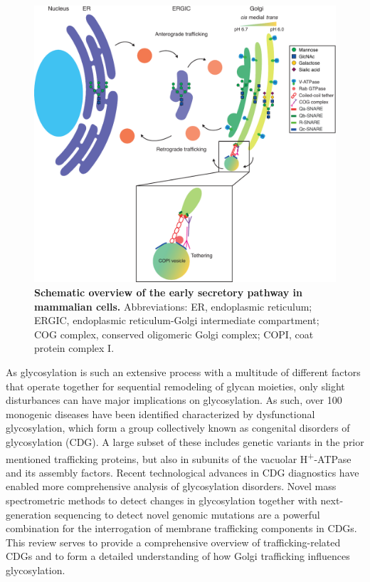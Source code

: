 \begin{figure}
    \includegraphics[keepaspectratio=true,width=\textwidth,height=\textheight]{chapters/chapter2/chapter2_Figure1.pdf}
    \caption{\textbf{Schematic overview of the early secretory pathway in mammalian cells.} Abbreviations: ER, endoplasmic reticulum; ERGIC, endoplasmic reticulum-Golgi intermediate compartment; COG complex, conserved oligomeric Golgi complex; COPI, coat protein complex I.}
    \label{fig:ch2fig1}
\end{figure}

As glycosylation is such an extensive process with a multitude of different factors that operate together for sequential remodeling of glycan moieties, only slight disturbances can have major implications on glycosylation. As such, over 100 monogenic diseases have been identified characterized by dysfunctional glycosylation, which form a group collectively known as congenital disorders of glycosylation (CDG)\cite{fisher_bridging_2016,freeze_genetic_2006,freeze_solving_2014}. A large subset of these includes genetic variants in the prior mentioned trafficking proteins, but also in subunits of the vacuolar H\textsuperscript{+}-ATPase and its assembly factors. Recent technological advances in CDG diagnostics have enabled more comprehensive analysis of glycosylation disorders. Novel mass spectrometric methods to detect changes in glycosylation\cite{scherpenzeel_high-resolution_2015,morelle_analysis_2007} together with next-generation sequencing to detect novel genomic mutations\cite{de_ligt_diagnostic_2012,gilissen_genome_2014} are a powerful combination for the interrogation of membrane trafficking components in CDGs. This review serves to provide a comprehensive overview of trafficking-related CDGs and to form a detailed understanding of how Golgi trafficking influences glycosylation.

